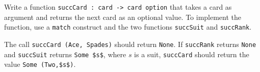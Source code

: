 Write a function \lstinline{succCard : card -> card option} that takes
a card as argument and returns the next card as an optional value.  To
implement the function, use a \lstinline{match} construct and the two
functions \lstinline{succSuit} and \lstinline{succRank}.

The call \lstinline{succCard (Ace, Spades)} should return
\lstinline{None}.
%
If \lstinline{succRank} returns \lstinline{None} and
\lstinline{succSuit} returns \lstinline[mathescape]{Some $s$}, where
$s$ is a suit, \lstinline{succCard} should return the value
\lstinline[mathescape]{Some (Two,$s$)}.
